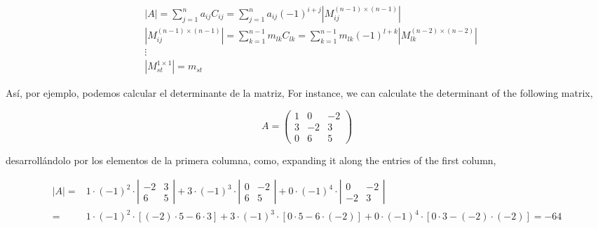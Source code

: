 \begin{align*}
&\vert A  \vert = \sum_{j=1}^na_{ij}C_{ij} =\sum_{j=1}^na_{ij}(-1)^{i+j} \left \vert M_{ij}^{(n-1)\times(n-1)} \right \vert \\
&\left \vert M_{ij}^{(n-1)\times(n-1)} \right \vert = \sum_{k=1}^{n-1}m_{lk}C_{lk} =\sum_{k=1}^{n-1}m_{lk}(-1)^{l+k} \left \vert M_{lk}^{(n-2)\times (n-2)} \right \vert\\
&\vdots \\
&\left \vert M_{st}^{1\times 1}\right \vert=m_{st} 
\end{align*}
\begin{paracol}{2}
Así, por ejemplo, podemos calcular el determinante de la matriz,
\switchcolumn
For instance, we can calculate the determinant of the following matrix,
\end{paracol}
\begin{equation*}
A=\begin{pmatrix}
1& 0& -2\\
3& -2& 3\\
0& 6& 5
\end{pmatrix}
\end{equation*}
\begin{paracol}{2}
desarrollándolo por los elementos de la primera columna, como,
\switchcolumn
expanding it along the entries of the first column,
\end{paracol}
\begin{align*}
\left\vert A \right\vert =& 1\cdot (-1)^2\cdot 
\left\vert \begin{matrix}
-2& 3\\ 
6& 5
\end{matrix} \right\vert + 3\cdot (-1)^3\cdot
\left\vert \begin{matrix}
0& -2\\ 
6& 5
\end{matrix} \right\vert+ 0\cdot (-1)^4 \cdot 
\left\vert \begin{matrix}
0& -2\\ 
-2& 3
\end{matrix} \right\vert \\
=& 1\cdot (-1)^2\cdot \left[ (-2)\cdot 5 - 6\cdot 3 \right] +3\cdot (-1)^3\cdot  \left[ 0\cdot 5 - 6\cdot (-2)\right] + 0\cdot (-1)^4 \cdot \left[ 0\cdot 3 - (-2)\cdot (-2)\right]= -64
\end{align*}

